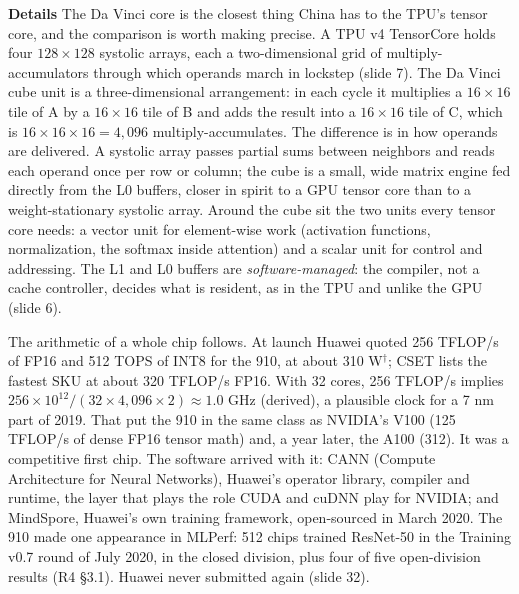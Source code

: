 \documentclass[11pt,letterpaper]{article}
\newcommand{\para}[1]{\medskip\noindent\textbf{#1}\quad}
\begin{document}
\para{Details} The Da Vinci core is the closest thing China has to the TPU's tensor core, and the comparison is worth making precise. A TPU v4 TensorCore holds four $128\times128$ systolic arrays, each a two-dimensional grid of multiply-accumulators through which operands march in lockstep (slide 7). The Da Vinci cube unit is a three-dimensional arrangement: in each cycle it multiplies a $16\times16$ tile of A by a $16\times16$ tile of B and adds the result into a $16\times16$ tile of C, which is $16\times16\times16 = 4{,}096$ multiply-accumulates. The difference is in how operands are delivered. A systolic array passes partial sums between neighbors and reads each operand once per row or column; the cube is a small, wide matrix engine fed directly from the L0 buffers, closer in spirit to a GPU tensor core than to a weight-stationary systolic array. Around the cube sit the two units every tensor core needs: a vector unit for element-wise work (activation functions, normalization, the softmax inside attention) and a scalar unit for control and addressing. The L1 and L0 buffers are \emph{software-managed}: the compiler, not a cache controller, decides what is resident, as in the TPU and unlike the GPU (slide 6).

The arithmetic of a whole chip follows. At launch Huawei quoted 256 TFLOP/s of FP16 and 512 TOPS of INT8 for the 910, at about 310 W$^\dagger$; CSET lists the fastest SKU at about 320 TFLOP/s FP16. With 32 cores, 256 TFLOP/s implies $256\times10^{12}/(32\times4{,}096\times2)\approx 1.0$ GHz (derived), a plausible clock for a 7 nm part of 2019. That put the 910 in the same class as NVIDIA's V100 (125 TFLOP/s of dense FP16 tensor math) and, a year later, the A100 (312). It was a competitive first chip. The software arrived with it: CANN (Compute Architecture for Neural Networks), Huawei's operator library, compiler and runtime, the layer that plays the role CUDA and cuDNN play for NVIDIA; and MindSpore, Huawei's own training framework, open-sourced in March 2020. The 910 made one appearance in MLPerf: 512 chips trained ResNet-50 in the Training v0.7 round of July 2020, in the closed division, plus four of five open-division results (R4 §3.1). Huawei never submitted again (slide 32).
\end{document}
